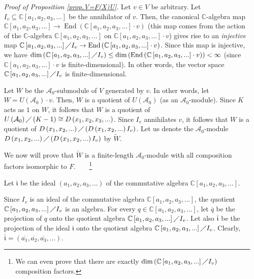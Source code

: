 \documentclass
[numbers=enddot,12pt,final,onecolumn,german,notitlepage]{scrartcl}%
\theoremstyle{definition}
\begin{document}
\textit{Proof of Proposition \ref{prop.V=F(X)U}.} Let $v\in V$ be arbitrary.
Let $I_{v}\subseteq\mathbb{C}\left[  a_{1},a_{2},a_{3},...\right]  $ be the
annihilator of $v$. Then, the canonical $\mathbb{C}$-algebra map
$\mathbb{C}\left[  a_{1},a_{2},a_{3},...\right]  \rightarrow
\operatorname*{End}\left(  \mathbb{C}\left[  a_{1},a_{2},a_{3},...\right]
\cdot v\right)  $ (this map comes from the action of the $\mathbb{C}$-algebra
$\mathbb{C}\left[  a_{1},a_{2},a_{3},...\right]  $ on $\mathbb{C}\left[
a_{1},a_{2},a_{3},...\right]  \cdot v$) gives rise to an \textit{injective}
map $\mathbb{C}\left[  a_{1},a_{2},a_{3},...\right]  \diagup I_{v}%
\rightarrow\operatorname*{End}\left(  \mathbb{C}\left[  a_{1},a_{2}%
,a_{3},...\right]  \cdot v\right)  $. Since this map is injective, we have
$\dim\left(  \mathbb{C}\left[  a_{1},a_{2},a_{3},...\right]  \diagup
I_{v}\right)  \leq\dim\left(  \operatorname*{End}\left(  \mathbb{C}\left[
a_{1},a_{2},a_{3},...\right]  \cdot v\right)  \right)  <\infty$ (since
$\mathbb{C}\left[  a_{1},a_{2},a_{3},...\right]  \cdot v$ is
finite-dimensional). In other words, the vector space $\mathbb{C}\left[
a_{1},a_{2},a_{3},...\right]  \diagup I_{v}$ is finite-dimensional.

Let $W$ be the $\mathcal{A}_{0}$-submodule of $V$ generated by $v$. In other
words, let $W=U\left(  \mathcal{A}_{0}\right)  \cdot v$. Then, $W$ is a
quotient of $U\left(  \mathcal{A}_{0}\right)  $ (as an $\mathcal{A}_{0}%
$-module). Since $K$ acts as $1$ on $W$, it follows that $W$ is a quotient of
$U\left(  \mathcal{A}_{0}\right)  \diagup\left(  K-1\right)  \cong D\left(
x_{1},x_{2},x_{3},...\right)  $. Since $I_{v}$ annihilates $v$, it follows
that $W$ is a quotient of $D\left(  x_{1},x_{2},...\right)  \diagup\left(
D\left(  x_{1},x_{2},...\right)  I_{v}\right)  $. Let us denote the
$\mathcal{A}_{0}$-module $D\left(  x_{1},x_{2},...\right)  \diagup\left(
D\left(  x_{1},x_{2},...\right)  I_{v}\right)  $ by $\widetilde{W}$.

We now will prove that $\widetilde{W}$ is a finite-length $\mathcal{A}_{0}%
$-module with all composition factors isomorphic to $F$.\ \ \ \ \footnote{We
can even prove that there are exactly $\dim\left(  \mathbb{C}\left[
a_{1},a_{2},a_{3},...\right]  \diagup I_{v}\right)  $ composition factors.}

Let $\mathfrak{i}$ be the ideal $\left(  a_{1},a_{2},a_{3},...\right)  $ of
the commutative algebra $\mathbb{C}\left[  a_{1},a_{2},a_{3},...\right]  $.

Since $I_{v}$ is an ideal of the commutative algebra $\mathbb{C}\left[
a_{1},a_{2},a_{3},...\right]  $, the quotient $\mathbb{C}\left[  a_{1}%
,a_{2},a_{3},...\right]  \diagup I_{v}$ is an algebra. For every
$q\in\mathbb{C}\left[  a_{1},a_{2},a_{3},...\right]  $, let $\overline{q}$ be
the projection of $q$ onto the quotient algebra $\mathbb{C}\left[  a_{1}%
,a_{2},a_{3},...\right]  \diagup I_{v}$. Let also $\overline{\mathfrak{i}}$ be
the projection of the ideal $\mathfrak{i}$ onto the quotient algebra
$\mathbb{C}\left[  a_{1},a_{2},a_{3},...\right]  \diagup I_{v}$. Clearly,
$\overline{\mathfrak{i}}=\left(  \overline{a_{1}},\overline{a_{2}}%
,\overline{a_{3}},...\right)  $.
\end{document}
